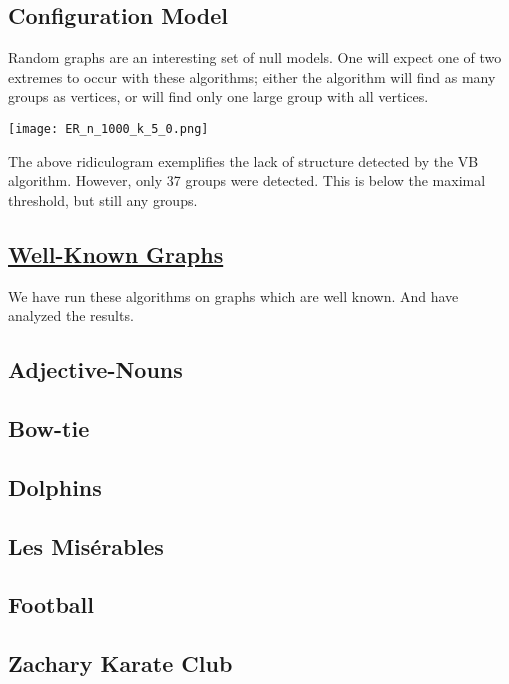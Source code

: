 \documentclass[twocolumn,twoside]{IEEEtran}
\begin{document}
\subsection*{Configuration Model}

Random graphs are an interesting set of null models. One will expect
one of two extremes to occur with these algorithms; either the algorithm
will find as many groups as vertices, or will find only one large group
with all vertices.

\texttt{[image: ER\_n\_1000\_k\_5\_0.png]}

The above ridiculogram exemplifies the lack of structure detected by the
VB algorithm. However, only 37 groups were detected. This is below the maximal
threshold, but still any groups.

\subsection*{\underline{Well-Known Graphs}}

We have run these algorithms on graphs which are well known. And have analyzed the
results.

\subsection*{Adjective-Nouns}


\subsection*{Bow-tie}


\subsection*{Dolphins}


\subsection*{Les Mis\'{e}rables}


\subsection*{Football}


\subsection*{Zachary Karate Club}

\end{document}
